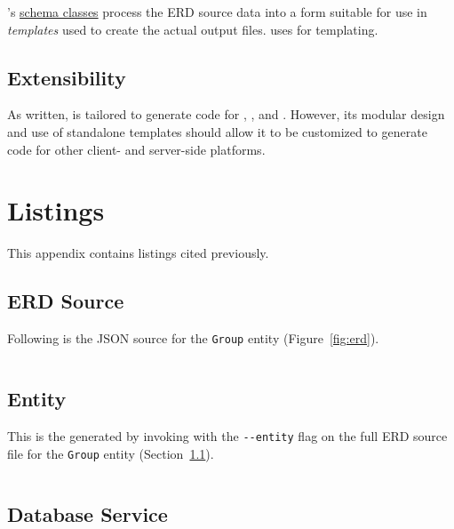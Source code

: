 \documentclass{article}
\begin{document}
\boil's \hyperref[sec:schema-classes]{schema classes}
process the ERD source data
into a form suitable for use in
\emph{templates} 
used to create the actual output files.
\boil{} uses \handlebars{}
for templating.


\subsection{Extensibility}
\label{sec:extensibility}

As written, \boil{} is
tailored to generate code for 
\nest, \vue, and \vuetify.
However, its modular design
and use of standalone \handlebars{} templates
should allow it to be customized
to generate code
for other client- and server-side platforms.

\newpage
\appendix

\section{Listings}
\label{sec:listings}

This appendix contains listings cited previously.

\subsection{ERD Source}
\label{sec:erd-source}

Following is the JSON source for the \texttt{Group} entity (Figure~\ref{fig:erd}).
\inputminted[linenos,stepnumber=5,frame=single,fontsize=\small]{JSON}{sample-erd.json}

\subsection{Entity}
\label{sec:output-entity}

This is the \ts{} generated
by invoking \boil{}
with the \texttt{-{}-entity}
flag on the full ERD source file
for the \texttt{Group} entity
(Section~\ref{sec:erd-source}).

\inputminted[linenos,stepnumber=5,frame=single,fontsize=\small]{TypeScript}{group-entity.ts}

\subsection{Database Service}
\label{sec:output-service}
\end{document}
